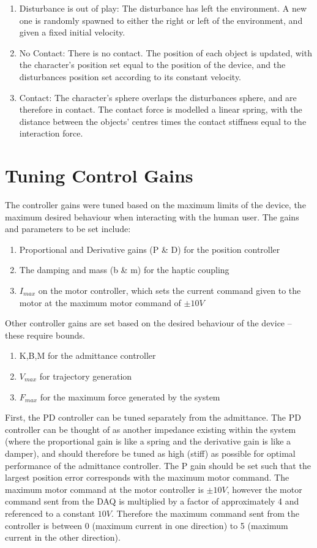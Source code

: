 \documentclass[12pt]{report}
\begin{document}
\begin{enumerate}
	\item Disturbance is out of play: The disturbance has left the environment. A new one is randomly spawned to either the right or left of the environment, and given a fixed initial velocity.
	\item No Contact: There is no contact. The position of each object is updated, with the character's position set equal to the position of the device, and the disturbances position set according to its constant velocity. 
	\item Contact: The character's sphere overlaps the disturbances sphere, and are therefore in contact. The contact force is modelled a linear spring, with the distance between the objects' centres times the contact stiffness equal to the interaction force. 
\end{enumerate}

	
	\section{Tuning Control Gains}

	The controller gains were tuned based on the maximum limits of the  device, the maximum desired behaviour when interacting with the human user. The gains and parameters to be set include:
	
	\begin{enumerate}
		\item Proportional and Derivative gains (P \& D) for the position controller 
		\item The damping and mass (b \& m) for the haptic coupling 
		\item $I_{max}$ on the motor controller, which sets the current command given to the motor at the maximum motor command of $\pm 10V$
	\end{enumerate}		
	
	Other controller gains are set based on the desired behaviour of the device -- these require bounds. 
	
	\begin{enumerate}
		\item K,B,M for the admittance controller
		\item $V_{max}$ for trajectory generation
		\item $F_{max}$ for the maximum force generated by the system
	\end{enumerate}
	
	
	First, the PD controller can be tuned separately from the admittance. The PD controller can be thought of as another impedance existing within the system (where the proportional gain is like a spring and the derivative gain is like a damper), and should therefore be tuned as high (stiff) as possible for optimal performance of the admittance controller. The P gain should be set such that the largest position error corresponds with the maximum motor command. The maximum motor command at the motor controller is $\pm 10V$, however the motor command sent from the DAQ is multiplied by a factor of approximately 4 and referenced to a constant $10 V$. Therefore the maximum command sent from the controller is between 0 (maximum current in one direction) to 5 (maximum current in the other direction). 
	
\end{document}

